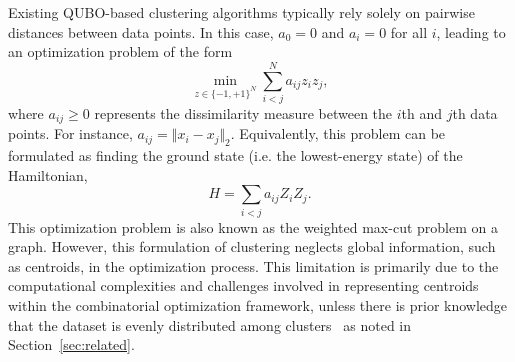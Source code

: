 \documentclass[showpacs,twocolumn,superscriptaddress]{revtex4-2}
\begin{document}
Existing QUBO-based clustering algorithms typically rely solely on pairwise distances between data points. In this case, $a_0=0$ and $a_i=0$ for all $i$, leading to an optimization problem of the form
\begin{equation}
    \label{eq:maxcut}
    \min_{z \in \{-1,+1\}^N} \sum_{i<j}^{N} a_{ij}z_iz_j,
\end{equation}
where $a_{ij}\ge 0$ represents the dissimilarity measure between the $i$th and $j$th data points. For instance, $a_{ij}=\Vert x_i - x_j\Vert_2$. Equivalently, this problem can be formulated as finding the ground state (i.e. the lowest-energy state) of the Hamiltonian,
\begin{equation}
    H = \sum_{i<j}a_{ij}Z_iZ_j.
\end{equation}
This optimization problem is also known as the weighted max-cut problem on a graph. However, this formulation of clustering neglects global information, such as centroids, in the optimization process. This limitation is primarily due to the computational complexities and challenges involved in representing centroids within the combinatorial optimization framework, unless there is prior knowledge that the dataset is evenly distributed among clusters~\cite{Kumar_2018,arthur2021balanced,date2021qubo} as noted in Section~\ref{sec:related}.
\end{document}
